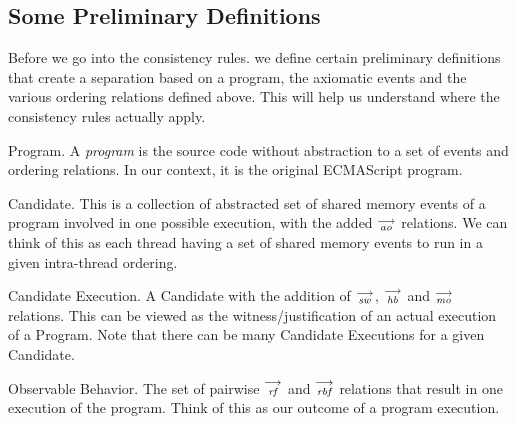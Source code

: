 
    \subsection{Some Preliminary Definitions}
        
        Before we go into the consistency rules. we define certain preliminary definitions that create a separation based on a program, the axiomatic events and the various ordering relations defined above. This will help us understand where the consistency rules actually apply. 
        
        \begin{definition}{Program.} 
            A \emph{program} is the source code without abstraction to a set of events and ordering relations. In our context, it is the original ECMAScript program. 
        \end{definition}
        
        \begin{definition}{Candidate.}
            This is a collection of abstracted set of shared memory events of a program involved in one possible execution, with the added $\stackrel{\longrightarrow}{_\textit{ao}}$ relations. We can think of this as each thread having a set of shared memory events to run in a given intra-thread ordering.
        \end{definition}
        
        \begin{definition}{Candidate Execution.}
            A Candidate with the addition of $\stackrel{\longrightarrow}{_\textit{sw}}$, $\stackrel{\longrightarrow}{_\textit{hb}}$ and $\stackrel{\longrightarrow}{_\textit{mo}}$ relations. This can be viewed as the witness/justification of an actual execution of a Program. Note that there can be many Candidate Executions for a given Candidate.
        \end{definition}
        
        \begin{definition}{Observable Behavior.}
        The set of pairwise $\stackrel{\longrightarrow}{_\textit{rf}}$ and $\stackrel{\longrightarrow}{_\textit{rbf}}$ relations that result in one execution of the program. Think of this as our outcome of a program execution.
        \end{definition}
